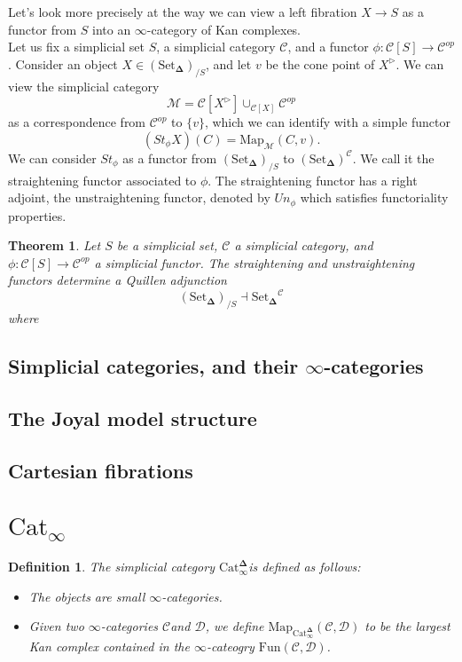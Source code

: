 \documentclass{amsart}
\newcommand{\8}{\ensuremath{\infty}}
\newcommand{\C}{\ensuremath{\mathscr{C}}}
\newcommand{\D}{\ensuremath{\mathscr{D}}}
\newcommand{\SSet}{\ensuremath{\text{Set}_{\boldsymbol{\Delta}}}}
\newcommand{\Catinfdel}{\ensuremath{\text{Cat}^{\boldsymbol{\Delta}}_{\infty}}}
\newcommand{\Map}{\ensuremath{\text{Map}}}
\newcommand{\Fun}{\ensuremath{\text{Fun}}}
\newtheorem{definition}{Definition}
\newtheorem{theorem}{Theorem}
\begin{document}
Let's look more precisely at the way we can view a left fibration $X\rightarrow S$ as a functor from $S$ into an $\8$-category of Kan complexes. \\
Let us fix a simplicial set $S$, a simplicial category $\mathcal{C}$, and a functor $\phi:\mathscr{C}[S]\rightarrow \mathcal{C}^{op}$. Consider an object $X\in(\SSet)_{/S}$, and let $v$ be the cone point of $X^{\triangleright}$. We can view the simplicial category
\[\mathcal{M} = \mathscr{C}[X^{\triangleright}]\displaystyle \cup_{\mathscr{C}[X]}\mathcal{C}^{op}\] as a correspondence from $\mathcal{C}^{op}$ to $\{v\}$, which we can identify with a simple functor 
\[(St_\phi X)(C)=\text{Map}_\mathcal{M}(C,v).\]
We can consider $St_\phi$ as a functor from $(\SSet)_{/S}$ to $(\SSet)^\mathcal{C}$. We call it the straightening functor associated to $\phi$. 
The straightening functor has a right adjoint, the unstraightening functor, denoted by $Un_\phi$ which satisfies functoriality properties.

\begin{theorem}
  Let $S$ be a simplicial set, $\mathcal{C}$ a simplicial category, and $\phi:\mathscr{C}[S]\rightarrow\mathcal{C}^{op}$ a simplicial functor. The straightening and unstraightening functors determine a Quillen adjunction 
  \[(\SSet)_{/S}\dashv \SSet^\mathcal{C}\]
  where
\end{theorem}


\subsection{Simplicial categories, and their \texorpdfstring{$\8$-categories}{∞-categories}}
\subsection{The Joyal model structure}
\subsection{Cartesian fibrations}

\section{\texorpdfstring{$\text{Cat}_\8$}{Cat∞}}

\begin{definition}
  The simplicial category \Catinfdel is defined as follows:
  \begin{itemize}
    \item The objects are small \8-categories.
    \item Given two \8-categories \C and \D, we define $\Map_{\Catinfdel}(\C, \D)$ to be the largest Kan complex contained in the \8-cateogry $\Fun(\C, \D)$.
  \end{itemize}
\end{definition}
\end{document}
